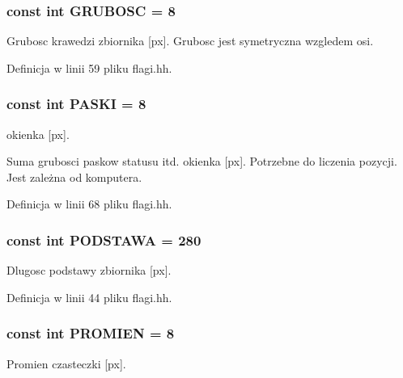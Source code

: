 \subsubsection[{G\+R\+U\+B\+O\+S\+C}]{\setlength{\rightskip}{0pt plus 5cm}const int G\+R\+U\+B\+O\+S\+C = 8}\label{flagi_8hh_a359a95636f17b8e9b7a01389d75b521d}
Grubosc krawedzi zbiornika \mbox{[}px\mbox{]}. Grubosc jest symetryczna wzgledem osi. 

Definicja w linii 59 pliku flagi.\+hh.

\hypertarget{flagi_8hh_afa380d01dc08ee237b4eea9046704397}{}
\subsubsection[{P\+A\+S\+K\+I}]{\setlength{\rightskip}{0pt plus 5cm}const int P\+A\+S\+K\+I = 8}\label{flagi_8hh_afa380d01dc08ee237b4eea9046704397}
okienka \mbox{[}px\mbox{]}.

Suma grubosci paskow statusu itd. okienka \mbox{[}px\mbox{]}. Potrzebne do liczenia pozycji. Jest zależna od komputera. 

Definicja w linii 68 pliku flagi.\+hh.

\hypertarget{flagi_8hh_acd3c5814c051e565bf7854f6403acf49}{}
\subsubsection[{P\+O\+D\+S\+T\+A\+W\+A}]{\setlength{\rightskip}{0pt plus 5cm}const int P\+O\+D\+S\+T\+A\+W\+A = 280}\label{flagi_8hh_acd3c5814c051e565bf7854f6403acf49}
Dlugosc podstawy zbiornika \mbox{[}px\mbox{]}. 

Definicja w linii 44 pliku flagi.\+hh.

\hypertarget{flagi_8hh_aa77f856f3142a9e81752665a9bc2e6de}{}
\subsubsection[{P\+R\+O\+M\+I\+E\+N}]{\setlength{\rightskip}{0pt plus 5cm}const int P\+R\+O\+M\+I\+E\+N = 8}\label{flagi_8hh_aa77f856f3142a9e81752665a9bc2e6de}
Promien czasteczki \mbox{[}px\mbox{]}. 

